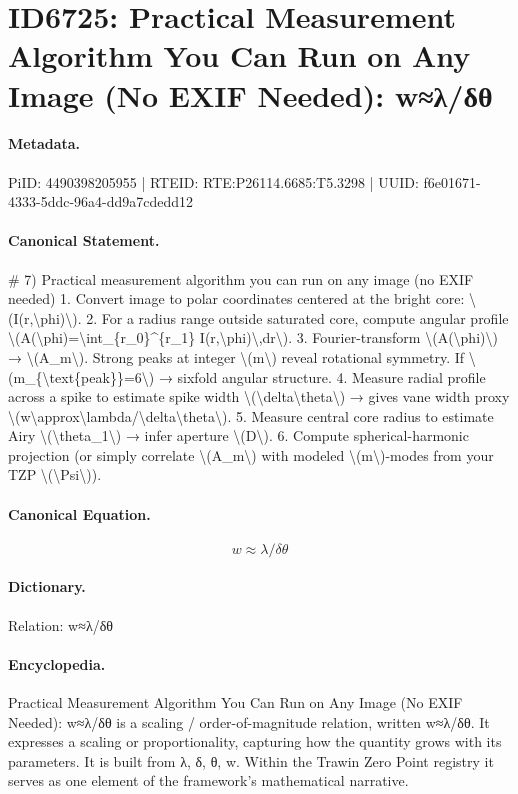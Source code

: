 \section*{ID6725: Practical Measurement Algorithm You Can Run on Any Image (No EXIF Needed): w≈λ/δθ}
\paragraph{Metadata.}
PiID: 4490398205955 | RTEID: RTE:P26114.6685:T5.3298 | UUID: f6e01671-4333-5ddc-96a4-dd9a7cdedd12

\paragraph{Canonical Statement.}
\# 7) Practical measurement algorithm you can run on any image (no EXIF needed) 1. Convert image to polar coordinates centered at the bright core: \textbackslash{}(I(r,\textbackslash{}phi)\textbackslash{}). 2. For a radius range outside saturated core, compute angular profile \textbackslash{}(A(\textbackslash{}phi)=\textbackslash{}int\_\{r\_0\}\textasciicircum{}\{r\_1\} I(r,\textbackslash{}phi)\textbackslash{},dr\textbackslash{}). 3. Fourier-transform \textbackslash{}(A(\textbackslash{}phi)\textbackslash{}) → \textbackslash{}(A\_m\textbackslash{}). Strong peaks at integer \textbackslash{}(m\textbackslash{}) reveal rotational symmetry. If \textbackslash{}(m\_\{\textbackslash{}text\{peak\}\}=6\textbackslash{}) → sixfold angular structure. 4. Measure radial profile across a spike to estimate spike width \textbackslash{}(\textbackslash{}delta\textbackslash{}theta\textbackslash{}) → gives vane width proxy \textbackslash{}(w\textbackslash{}approx\textbackslash{}lambda/\textbackslash{}delta\textbackslash{}theta\textbackslash{}). 5. Measure central core radius to estimate Airy \textbackslash{}(\textbackslash{}theta\_1\textbackslash{}) → infer aperture \textbackslash{}(D\textbackslash{}). 6. Compute spherical-harmonic projection (or simply correlate \textbackslash{}(A\_m\textbackslash{}) with modeled \textbackslash{}(m\textbackslash{})-modes from your TZP \textbackslash{}(\textbackslash{}Psi\textbackslash{})).

\paragraph{Canonical Equation.}
\[
w\approx\lambda/\delta\theta
\]

\paragraph{Dictionary.}
Relation: w≈λ/δθ

\paragraph{Encyclopedia.}
Practical Measurement Algorithm You Can Run on Any Image (No EXIF Needed): w≈λ/δθ is a scaling / order-of-magnitude relation, written w≈λ/δθ. It expresses a scaling or proportionality, capturing how the quantity grows with its parameters. It is built from λ, δ, θ, w. Within the Trawin Zero Point registry it serves as one element of the framework's mathematical narrative.
